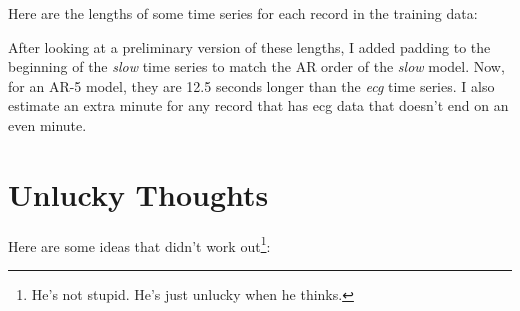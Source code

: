 \documentclass[12pt]{article}
\begin{document}
Here are the lengths of some time series for each record in the
training data:



After looking at a preliminary version of these lengths, I added
padding to the beginning of the \emph{slow} time series to match the
AR order of the \emph{slow} model.  Now, for an AR-5 model, they are
12.5 seconds longer than the \emph{ecg} time series.  I also estimate
an extra minute for any record that has ecg data that doesn't end on
an even minute.

\section{Unlucky Thoughts}
\label{sec:unlucky}

Here are some ideas that didn't work out\footnote{He's not stupid.
  He's just unlucky when he thinks.}:
\end{document}
